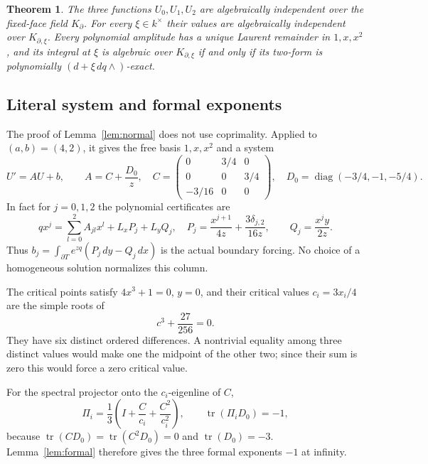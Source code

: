 \documentclass[11pt]{article}
\numberwithin{equation}{section}
\newtheorem{theorem}{Theorem}[section]
\theoremstyle{definition}
\theoremstyle{remark}
\begin{document}
\begin{theorem}\label{thm:noncoprime}
The three functions $U_0,U_1,U_2$ are algebraically independent over the
fixed-face field $K_\partial$. For every $\xi\in k^\times$ their values are
algebraically independent over $K_{\partial,\xi}$. Every polynomial amplitude
has a unique Laurent remainder in $1,x,x^2$, and its integral at $\xi$ is
algebraic over $K_{\partial,\xi}$ if and only if its two-form is polynomially
$(d+\xi\,dq\wedge)$-exact.
\end{theorem}

\subsection{Literal system and formal exponents}
The proof of Lemma~\ref{lem:normal} does not use coprimality. Applied to
$(a,b)=(4,2)$, it gives the free basis $1,x,x^2$ and a system
\begin{equation}\label{eq:rank-three-system}
 U'=AU+b,\qquad
 A=C+\frac{D_0}{z},\quad
 C=\begin{pmatrix}0&3/4&0\\0&0&3/4\\-3/16&0&0\end{pmatrix},\quad
 D_0=\operatorname{diag}(-3/4,-1,-5/4).
\end{equation}
In fact for $j=0,1,2$ the polynomial certificates are
\[
 qx^j=\sum_{l=0}^2 A_{jl}x^l+L_xP_j+L_yQ_j,
 \quad
 P_j=\frac{x^{j+1}}{4z}+\frac{3\delta_{j,2}}{16z},\qquad
 Q_j=\frac{x^jy}{2z}.
\]
Thus $b_j=\int_{\partial T}e^{zq}(P_j\,dy-Q_j\,dx)$ is the actual boundary
forcing. No choice of a homogeneous solution normalizes this column.

The critical points satisfy $4x^3+1=0$, $y=0$, and their critical values
$c_i=3x_i/4$ are the simple roots of
\[
 c^3+\frac{27}{256}=0.
\]
They have six distinct ordered differences. A nontrivial equality among
three distinct values would make one the midpoint of the other two;
since their sum is zero this would force a zero critical value.

For the spectral projector onto the $c_i$-eigenline of $C$,
\[
 \Pi_i=\frac13\left(I+\frac C{c_i}+\frac{C^2}{c_i^2}\right),
 \qquad \operatorname{tr}(\Pi_iD_0)=-1,
\]
because $\operatorname{tr}(CD_0)=\operatorname{tr}(C^2D_0)=0$ and
$\operatorname{tr}(D_0)=-3$. Lemma~\ref{lem:formal} therefore gives the
three formal exponents $-1$ at infinity.
\end{document}
